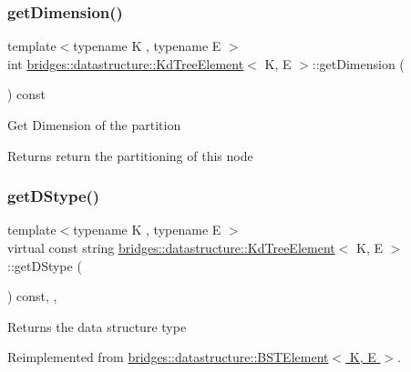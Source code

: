 \subsubsection{\texorpdfstring{get\+Dimension()}{getDimension()}}
{\footnotesize\ttfamily template$<$typename K , typename E $>$ \\
int \hyperlink{classbridges_1_1datastructure_1_1_kd_tree_element}{bridges\+::datastructure\+::\+Kd\+Tree\+Element}$<$ K, E $>$\+::get\+Dimension (\begin{DoxyParamCaption}{ }\end{DoxyParamCaption}) const\hspace{0.3cm}{\ttfamily [inline]}}

Get Dimension of the partition \begin{DoxyReturn}{Returns}
return the partitioning of this node 
\end{DoxyReturn}
\mbox{\label{classbridges_1_1datastructure_1_1_kd_tree_element_a76f6d9bfadfdec09d0a8564aa0e33235}} 
\subsubsection{\texorpdfstring{get\+D\+Stype()}{getDStype()}}
{\footnotesize\ttfamily template$<$typename K , typename E $>$ \\
virtual const string \hyperlink{classbridges_1_1datastructure_1_1_kd_tree_element}{bridges\+::datastructure\+::\+Kd\+Tree\+Element}$<$ K, E $>$\+::get\+D\+Stype (\begin{DoxyParamCaption}{ }\end{DoxyParamCaption}) const\hspace{0.3cm}{\ttfamily [inline]}, {\ttfamily [override]}, {\ttfamily [virtual]}}

\begin{DoxyReturn}{Returns}
the data structure type 
\end{DoxyReturn}


Reimplemented from \hyperlink{classbridges_1_1datastructure_1_1_b_s_t_element_a2bb8cc9ec4b6bc5b89ecef0f17be366f}{bridges\+::datastructure\+::\+B\+S\+T\+Element$<$ K, E $>$}.

\mbox{\label{classbridges_1_1datastructure_1_1_kd_tree_element_a5413ecaf152e3df5fb45dd85da812888}} 
